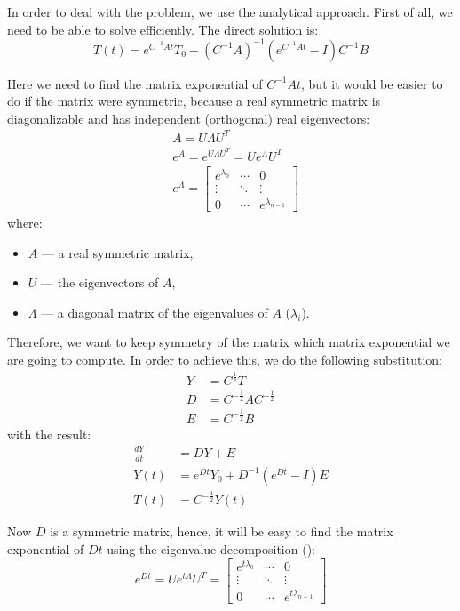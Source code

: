 In order to deal with the problem, we use the analytical approach. First of all, we need to be able to solve  efficiently. The direct solution is:
\begin{equation} \label{eq:solution}
  T(t) = e^{C^{-1}At}T_{0} + (C^{-1}A)^{-1}(e^{C^{-1}At} - I)C^{-1}B
\end{equation}

Here we need to find the matrix exponential of $C^{-1} At$, but it would be easier to do if the matrix were symmetric, because a real symmetric matrix is diagonalizable and has independent (orthogonal) real eigenvectors:
\begin{align}
  & A = U \Lambda U^T \label{eq:eigenvalue-decomposition} \\
  & e^A = e^{U \Lambda U^T} = U e^{\Lambda} U^T \nonumber \\
  & e^{\Lambda} = \left[
      \begin{array}{ccc}
        e^{\lambda_0} & \cdots & 0 \\
        \vdots & \ddots & \vdots \\
        0 & \cdots & e^{\lambda_{n - 1}}
      \end{array}
    \right] \nonumber
\end{align}
where:
\begin{itemize}
  \item $A$ --- a real symmetric matrix,
  \item $U$ --- the eigenvectors of $A$,
  \item $\Lambda$ --- a diagonal matrix of the eigenvalues of $A$ ($\lambda_i$).
\end{itemize}

Therefore, we want to keep symmetry of the matrix which matrix exponential we are going to compute. In order to achieve this, we do the following substitution:
\begin{align*}
  Y & = C^{\frac{1}{2}} T \\
  D & = C^{-\frac{1}{2}} A C^{-\frac{1}{2}} \\
  E & = C^{-\frac{1}{2}} B
\end{align*}
with the result:
\begin{align}
  \frac{dY}{dt} & = DY + E \nonumber \\
  Y(t) & = e^{Dt}Y_{0} + D^{-1}(e^{Dt} - I)E \label{eq:modified-solution} \\
  T(t) & = C^{-\frac{1}{2}} Y(t) \nonumber
\end{align}

Now $D$ is a symmetric matrix, hence, it will be easy to find the matrix exponential of $D t$ using the eigenvalue decomposition ():
\[
  e^{D t} = U e^{t \Lambda} U^T = \left[
      \begin{array}{ccc}
        e^{t \lambda_0} & \cdots & 0 \\
        \vdots & \ddots & \vdots \\
        0 & \cdots & e^{t \lambda_{n - 1}}
      \end{array}
    \right]
\]

